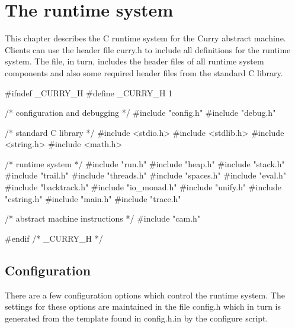%
%
\section{The runtime system}
This chapter describes the C runtime system for the Curry abstract
machine. Clients can use the header file {\Tt{}curry.h\nwendquote} to include all
definitions for the runtime system. The file, in turn, includes the
header files of all runtime system components and also some required
header files from the standard C library.

\nwenddocs{}\endmoddef\nwstartdeflinemarkup\nwenddeflinemarkup
#ifndef _CURRY_H
#define _CURRY_H 1

/* configuration and debugging */
#include "config.h"
#include "debug.h"

/* standard C library */
#include <stdio.h>
#include <stdlib.h>
#include <string.h>
#include <math.h>

/* runtime system */
#include "run.h"
#include "heap.h"
#include "stack.h"
#include "trail.h"
#include "threads.h"
#include "spaces.h"
#include "eval.h"
#include "backtrack.h"
#include "io_monad.h"
#include "unify.h"
#include "cstring.h"
#include "main.h"
#include "trace.h"

/* abstract machine instructions */
#include "cam.h"

#endif /* _CURRY_H */

\nwendcode{}\nwdocspar
\subsection{Configuration}
There are a few configuration options which control the runtime
system. The settings for these options are maintained in the file
{\Tt{}config.h\nwendquote} which in turn is generated from the template found in
{\Tt{}config.h.in\nwendquote} by the {\Tt{}configure\nwendquote} script.


